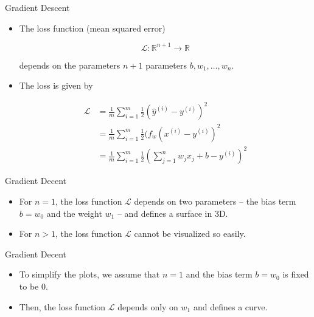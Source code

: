 \documentclass{beamer}
\begin{document}
\begin{frame}{Gradient Descent}
\begin{itemize}
\item The loss function (mean squared error)

$$\mathcal{L} : \mathbb{R}^{n+1} \rightarrow \mathbb{R}$$ 

\medskip
depends on the parameters $n+1$ parameters $b, w_1, \ldots, w_n$.

\medskip
\item The loss is given by

\begin{align*} 
\mathcal{L} 
&= \frac{1}{m} \sum_{i=1}^m \frac{1}{2} (\hat{y}^{(i)} - y^{(i)})^2 \\
&= \frac{1}{m} \sum_{i=1}^m \frac{1}{2} (f_w(x^{(i)} - y^{(i)})^2 \\
&= \frac{1}{m} \sum_{i=1}^m \frac{1}{2} \left( \sum_{j=1}^n w_j x_j + b- y^{(i)} \right)^2 
\end{align*}

\end{itemize}
\end{frame}


\begin{frame}{Gradient Decent}
\begin{itemize}
\item For $n=1$, the loss function $\mathcal{L}$ depends on two parameters -- the bias term $b=w_0$ and the weight $w_1$ -- and defines a surface in 3D.

\medskip
\item For $n>1$, the loss function $\mathcal{L}$ cannot be visualized so easily.
\end{itemize}
\end{frame}


\begin{frame}{Gradient Decent}
\begin{itemize}
\item To simplify the plots, we assume that $n=1$ and the bias term $b=w_0$ is fixed to be $0$.  

\medskip
\item Then, the loss function $\mathcal{L}$ depends only on $w_1$ and defines a curve. 
\end{itemize}
\end{frame}

\end{document}
